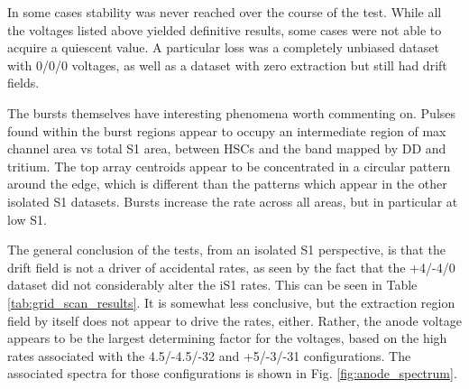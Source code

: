 In some cases stability was never reached over the course of the test. 
While all the voltages listed above yielded definitive results, some cases were not able to acquire a quiescent value.
A particular loss was a completely unbiased dataset with 0/0/0 voltages, as well as a dataset with zero extraction but still had drift fields.

The bursts themselves have interesting phenomena worth commenting on.
Pulses found within the burst regions appear to occupy an intermediate region of max channel area vs total S1 area, between HSCs and the band mapped by DD and tritium.
The top array centroids appear to be concentrated in a circular pattern around the edge, which is different than the patterns which appear in the other isolated S1 datasets.
Bursts increase the rate across all areas, but in particular at low S1.

The general conclusion of the tests, from an isolated S1 perspective, is that the drift field is not a driver of accidental rates, as seen by the fact that the +4/-4/0 dataset did not considerably alter the iS1 rates.
This can be seen in Table \ref{tab:grid_scan_results}.
It is somewhat less conclusive, but the extraction region field by itself does not appear to drive the rates, either.
Rather, the anode voltage appears to be the largest determining factor for the voltages, based on the high rates associated with the 4.5/-4.5/-32 and +5/-3/-31 configurations.
The associated spectra for those configurations is shown in Fig. \ref{fig:anode_spectrum}.

